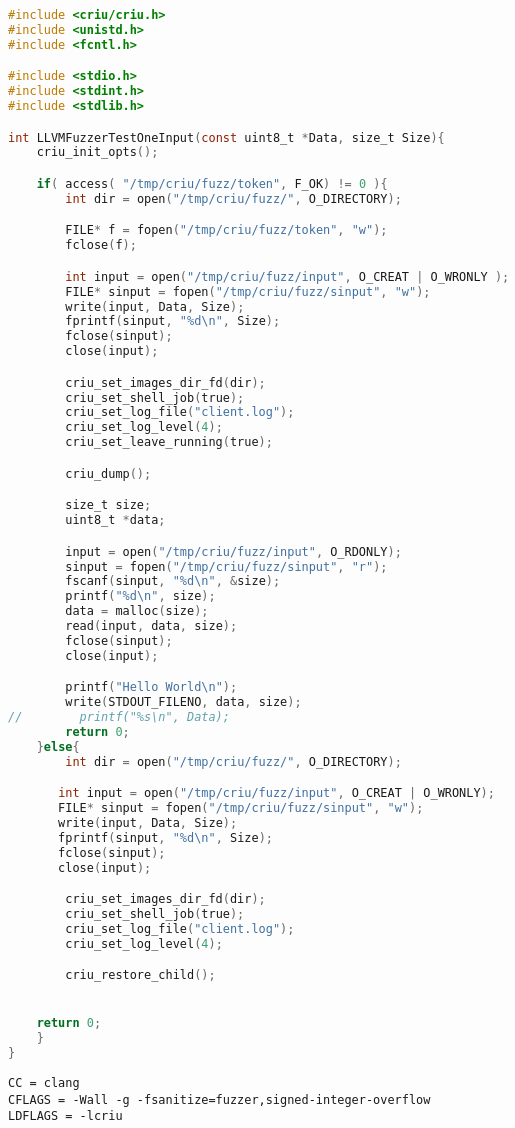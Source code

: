 \documentclass[a4paper]{article}
\begin{document}
\begin{lstlisting}[caption=libFuzzer Fuzz-Target,language=C]
#include <criu/criu.h>
#include <unistd.h>
#include <fcntl.h>

#include <stdio.h>
#include <stdint.h>
#include <stdlib.h>

int LLVMFuzzerTestOneInput(const uint8_t *Data, size_t Size){
    criu_init_opts();

    if( access( "/tmp/criu/fuzz/token", F_OK) != 0 ){
        int dir = open("/tmp/criu/fuzz/", O_DIRECTORY);

        FILE* f = fopen("/tmp/criu/fuzz/token", "w");
        fclose(f);

        int input = open("/tmp/criu/fuzz/input", O_CREAT | O_WRONLY );
        FILE* sinput = fopen("/tmp/criu/fuzz/sinput", "w");
        write(input, Data, Size);
        fprintf(sinput, "%d\n", Size);
        fclose(sinput);
        close(input);

        criu_set_images_dir_fd(dir);
        criu_set_shell_job(true);
        criu_set_log_file("client.log");
        criu_set_log_level(4);
        criu_set_leave_running(true);

        criu_dump();

        size_t size;
        uint8_t *data;

        input = open("/tmp/criu/fuzz/input", O_RDONLY);
        sinput = fopen("/tmp/criu/fuzz/sinput", "r");
        fscanf(sinput, "%d\n", &size);
        printf("%d\n", size);
        data = malloc(size);
        read(input, data, size);
        fclose(sinput);
        close(input);

        printf("Hello World\n");
        write(STDOUT_FILENO, data, size);
//        printf("%s\n", Data);
        return 0;
    }else{
        int dir = open("/tmp/criu/fuzz/", O_DIRECTORY);

       int input = open("/tmp/criu/fuzz/input", O_CREAT | O_WRONLY);
       FILE* sinput = fopen("/tmp/criu/fuzz/sinput", "w");
       write(input, Data, Size);
       fprintf(sinput, "%d\n", Size);
       fclose(sinput);
       close(input);

        criu_set_images_dir_fd(dir);
        criu_set_shell_job(true);
        criu_set_log_file("client.log");
        criu_set_log_level(4);

        criu_restore_child();


    return 0;
    }
}
\end{lstlisting}

\begin{lstlisting}[caption=libFuzzer Makefile,language=Make]
CC = clang
CFLAGS = -Wall -g -fsanitize=fuzzer,signed-integer-overflow 
LDFLAGS = -lcriu
\end{lstlisting}
\end{document}
